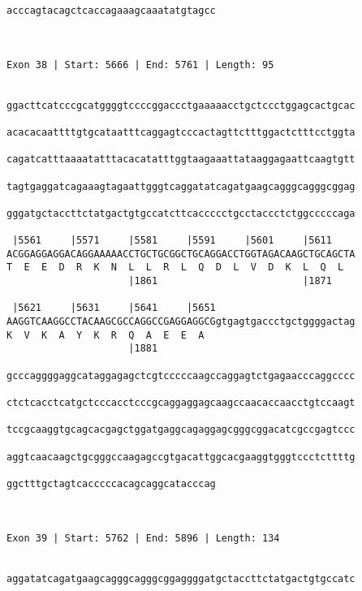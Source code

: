 \documentclass{article}
\begin{document}
\begin{Verbatim}
acccagtacagctcaccagaaagcaaatatgtagcc
                                    
                                    
 
Exon 38 | Start: 5666 | End: 5761 | Length: 95


ggacttcatcccgcatggggtccccggaccctgaaaaacctgctccctggagcactgcac
                                                            
acacacaattttgtgcataatttcaggagtcccactagttctttggactctttcctggta
                                                            
cagatcatttaaaatatttacacatatttggtaagaaattataaggagaattcaagtgtt
                                                            
tagtgaggatcagaaagtagaattgggtcaggatatcagatgaagcagggcagggcggag
                                                            
gggatgctaccttctatgactgtgccatcttcaccccctgcctaccctctggcccccaga
                                                            
 |5561     |5571     |5581     |5591     |5601     |5611    
ACGGAGGAGGACAGGAAAAACCTGCTGCGGCTGCAGGACCTGGTAGACAAGCTGCAGCTA
T  E  E  D  R  K  N  L  L  R  L  Q  D  L  V  D  K  L  Q  L  
                     |1861                         |1871    
  
 |5621     |5631     |5641     |5651                        
AAGGTCAAGGCCTACAAGCGCCAGGCCGAGGAGGCGgtgagtgaccctgctggggactag
K  V  K  A  Y  K  R  Q  A  E  E  A                          
                     |1881                                  
  
gcccaggggaggcataggagagctcgtcccccaagccaggagtctgagaacccaggcccc
                                                            
ctctcacctcatgctcccacctcccgcaggaggagcaagccaacaccaacctgtccaagt
                                                            
tccgcaaggtgcagcacgagctggatgaggcagaggagcgggcggacatcgccgagtccc
                                                            
aggtcaacaagctgcgggccaagagccgtgacattggcacgaaggtgggtccctcttttg
                                                            
ggctttgctagtcacccccacagcaggcatacccag
                                    
                                    
 
Exon 39 | Start: 5762 | End: 5896 | Length: 134


aggatatcagatgaagcagggcagggcggaggggatgctaccttctatgactgtgccatc
                                                            

\end{Verbatim}
\end{document}
